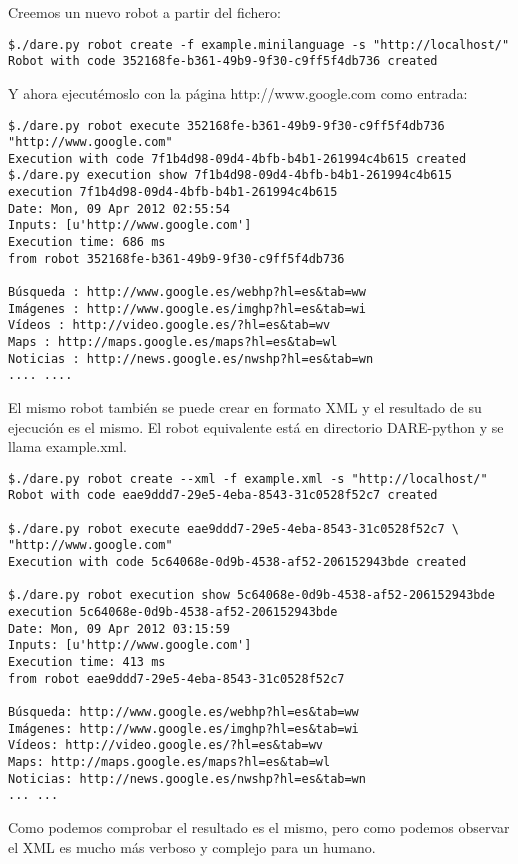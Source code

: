 Creemos un nuevo robot a partir del fichero:
\begin{verbatim}
$./dare.py robot create -f example.minilanguage -s "http://localhost/"
Robot with code 352168fe-b361-49b9-9f30-c9ff5f4db736 created
\end{verbatim}

Y ahora ejecutémoslo con la página http://www.google.com como entrada:

\begin{verbatim}
$./dare.py robot execute 352168fe-b361-49b9-9f30-c9ff5f4db736 "http://www.google.com"
Execution with code 7f1b4d98-09d4-4bfb-b4b1-261994c4b615 created
$./dare.py execution show 7f1b4d98-09d4-4bfb-b4b1-261994c4b615
execution 7f1b4d98-09d4-4bfb-b4b1-261994c4b615
Date: Mon, 09 Apr 2012 02:55:54
Inputs: [u'http://www.google.com']
Execution time: 686 ms
from robot 352168fe-b361-49b9-9f30-c9ff5f4db736

Búsqueda : http://www.google.es/webhp?hl=es&tab=ww
Imágenes : http://www.google.es/imghp?hl=es&tab=wi
Vídeos : http://video.google.es/?hl=es&tab=wv
Maps : http://maps.google.es/maps?hl=es&tab=wl
Noticias : http://news.google.es/nwshp?hl=es&tab=wn
.... ....
\end{verbatim}

El mismo robot también se puede crear en formato XML y el resultado de
su ejecución es el mismo. El robot equivalente está en directorio
DARE-python y se llama example.xml.

\begin{verbatim}
$./dare.py robot create --xml -f example.xml -s "http://localhost/"
Robot with code eae9ddd7-29e5-4eba-8543-31c0528f52c7 created

$./dare.py robot execute eae9ddd7-29e5-4eba-8543-31c0528f52c7 \
"http://www.google.com"
Execution with code 5c64068e-0d9b-4538-af52-206152943bde created

$./dare.py robot execution show 5c64068e-0d9b-4538-af52-206152943bde
execution 5c64068e-0d9b-4538-af52-206152943bde
Date: Mon, 09 Apr 2012 03:15:59
Inputs: [u'http://www.google.com']
Execution time: 413 ms
from robot eae9ddd7-29e5-4eba-8543-31c0528f52c7

Búsqueda: http://www.google.es/webhp?hl=es&tab=ww
Imágenes: http://www.google.es/imghp?hl=es&tab=wi
Vídeos: http://video.google.es/?hl=es&tab=wv
Maps: http://maps.google.es/maps?hl=es&tab=wl
Noticias: http://news.google.es/nwshp?hl=es&tab=wn
... ...
\end{verbatim}

Como podemos comprobar el resultado es el mismo, pero como podemos
observar el XML es mucho más verboso y complejo para un humano.

